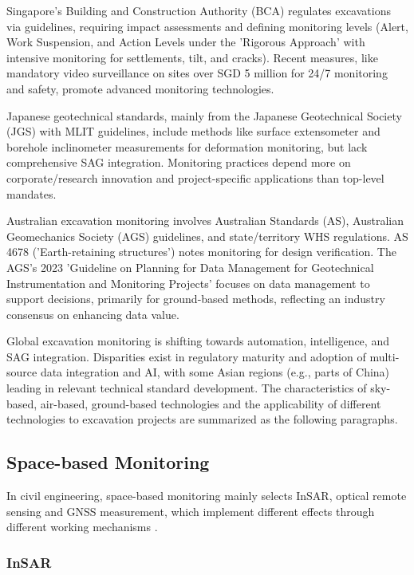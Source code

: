 \documentclass[preprint,11pt,authoryear,3p]{elsarticle}
\begin{document}
Singapore's Building and Construction Authority (BCA) regulates excavations via guidelines, requiring impact assessments and defining monitoring levels (Alert, Work Suspension, and Action Levels under the 'Rigorous Approach' with intensive monitoring for settlements, tilt, and cracks). Recent measures, like mandatory video surveillance on sites over SGD 5 million for 24/7 monitoring and safety, promote advanced monitoring technologies.

Japanese geotechnical standards, mainly from the Japanese Geotechnical Society (JGS) with MLIT guidelines, include methods like surface extensometer \citep{JGS1725:2012} and borehole inclinometer measurements \citep{JGS3722:2012} for deformation monitoring, but lack comprehensive SAG integration. Monitoring practices depend more on corporate/research innovation and project-specific applications than top-level mandates.

Australian excavation monitoring involves Australian Standards (AS), Australian Geomechanics Society (AGS) guidelines, and state/territory WHS regulations. AS 4678 \citep{AS4678:2002} ('Earth-retaining structures') notes monitoring for design verification. The AGS's 2023 'Guideline on Planning for Data Management for Geotechnical Instrumentation and Monitoring Projects' \citep{AGS:DataManagementGuide2023} focuses on data management to support decisions, primarily for ground-based methods, reflecting an industry consensus on enhancing data value.

Global excavation monitoring is shifting towards automation, intelligence, and SAG integration. Disparities exist in regulatory maturity and adoption of multi-source data integration and AI, with some Asian regions (e.g., parts of China) leading in relevant technical standard development. The characteristics of sky-based, air-based, ground-based technologies and the applicability of different technologies to excavation projects are summarized as the following paragraphs.

\subsection{Space-based Monitoring}

In civil engineering, space-based monitoring mainly selects InSAR, optical remote sensing and GNSS measurement, which implement different effects through different working mechanisms \citep{KOOHMISHI2024105378}.

\subsubsection{InSAR}
\end{document}
